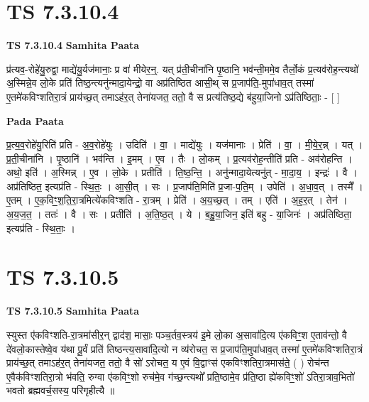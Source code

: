 \documentclass[17pt]{extarticle}
\begin{document}
\section*{ TS 7.3.10.4 }

\textbf{TS 7.3.10.4 } \newline
\textbf{Samhita Paata} \newline

प्र॑त्यव॒-रोहे॑यु॒रुद्वा॒ माद्ये॑यु॒र्यज॑मानाः॒ प्र वा॑ मीयेर॒न्॒. यत् प्र॑ती॒चीना॑नि पृ॒ष्ठानि॒ भव॑न्ती॒ममे॒व तैर्लो॒कं प्र॒त्यव॑रोह॒न्त्यथो॑ अ॒स्मिन्ने॒व लो॒के प्रति॑ तिष्ठ॒न्त्यनु॑न्मादा॒येन्द्रो॒ वा अप्र॑तिष्ठित आसी॒थ् स प्र॒जाप॑ति॒-मुपा॑धाव॒त् तस्मा॑ ए॒तमे॑कविꣳशतिरा॒त्रं प्राय॑च्छ॒त् तमाऽह॑र॒त् तेना॑यजत॒ ततो॒ वै स प्रत्य॑तिष्ठ॒द्ये ब॑हुया॒जिनो ऽप्र॑तिष्ठिताः॒ - [  ] \newline

\textbf{Pada Paata} \newline

प्र॒त्य॒व॒रोहे॑यु॒रिति॑ प्रति - अ॒व॒रोहे॑युः । उदिति॑ । वा॒ । माद्ये॑युः । यज॑मानाः । प्रेति॑ । वा॒ । मी॒ये॒र॒न्न् । यत् । प्र॒ती॒चीना॑नि । पृ॒ष्ठानि॑ । भव॑न्ति । इ॒मम् । ए॒व । तैः । लो॒कम् । प्र॒त्यव॑रोह॒न्तीति॑ प्रति - अव॑रोहन्ति । अथो॒ इति॑ । अ॒स्मिन्न् । ए॒व । लो॒के । प्रतीति॑ । ति॒ष्ठ॒न्ति॒ । अनु॑न्मादा॒येत्यनु॑त् - मा॒दा॒य॒ । इन्द्रः॑ । वै । अप्र॑तिष्ठित॒ इत्यप्र॑ति - स्थि॒तः॒ । आ॒सी॒त् । सः । प्र॒जाप॑ति॒मिति॑ प्र॒जा-प॒ति॒म् । उपेति॑ । अ॒धा॒व॒त् । तस्मै᳚ । ए॒तम् । ए॒क॒विꣳ॒॒श॒ति॒रा॒त्रमित्ये॑कविꣳशति - रा॒त्रम् । प्रेति॑ । अ॒य॒च्छ॒त् । तम् । एति॑ । अ॒ह॒र॒त् । तेन॑ । अ॒य॒ज॒त॒ । ततः॑ । वै । सः । प्रतीति॑ । अ॒ति॒ष्ठ॒त् । ये । ब॒हु॒या॒जिन॒ इति॑ बहु - या॒जिनः॑ । अप्र॑तिष्ठिता॒ इत्यप्र॑ति - स्थि॒ताः॒ ।  \newline




\section*{ TS 7.3.10.5 }

\textbf{TS 7.3.10.5 } \newline
\textbf{Samhita Paata} \newline

स्युस्त ए॑कविꣳशति-रा॒त्रमा॑सीर॒न् द्वाद॑श॒ मासाः॒ पञ्च॒र्तव॒स्त्रय॑ इ॒मे लो॒का अ॒सावा॑दि॒त्य ए॑कविꣳ॒॒श ए॒ताव॑न्तो॒ वै दे॑वलो॒कास्तेष्वे॒व य॑था पू॒र्वं प्रति॑ तिष्ठन्त्य॒सावा॑दि॒त्यो न व्य॑रोचत॒ स प्र॒जाप॑ति॒मुपा॑धाव॒त् तस्मा॑ ए॒तमे॑कविꣳशतिरा॒त्रं प्राय॑च्छ॒त् तमाऽह॑र॒त् तेना॑यजत॒ ततो॒ वै सो॑ ऽरोचत॒ य ए॒वं वि॒द्वाꣳस॑ एकविꣳशतिरा॒त्रमास॑ते॒ ( ) रोच॑न्त ए॒वैक॑विꣳशतिरा॒त्रो भ॑वति॒ रुग्वा ए॑कविꣳ॒॒शो रुच॑मे॒व ग॑च्छ॒न्त्यथो᳚ प्रति॒ष्ठामे॒व प्र॑ति॒ष्ठा ह्ये॑कविꣳ॒॒शो॑ ऽतिरा॒त्राव॒भितो॑ भवतो ब्रह्मवर्च॒सस्य॒ परि॑गृहीत्यै ॥ \newline
\end{document}
